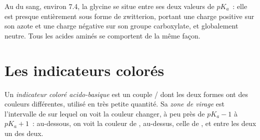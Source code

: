 \begin{example}\label{ex:g12:buffers-predominance:glycine}
Au  du sang, environ 7.4, la glycine se situe entre ses deux valeurs
de $pK_a$~: elle est presque entièrement sous forme de zwitterion,
portant une charge positive sur son azote et une charge négative sur son
groupe carboxylate, et globalement neutre. Tous les acides aminés se
comportent de la même façon.
\end{example}

\section{Les indicateurs colorés}


\begin{definition}\label{def:g12:buffers-predominance:indicator}
Un \emph{indicateur coloré acido-basique}
est un couple / dont les deux formes ont des couleurs
différentes, utilisé en très petite quantité. Sa \emph{zone de
virage} est l'intervalle de  sur lequel on voit
la couleur changer, à peu près de
$pK_a - 1$ à $pK_a + 1$~: au-dessous, on voit la couleur de ,
au-dessus, celle de , et entre les deux un  des deux.
\end{definition}

